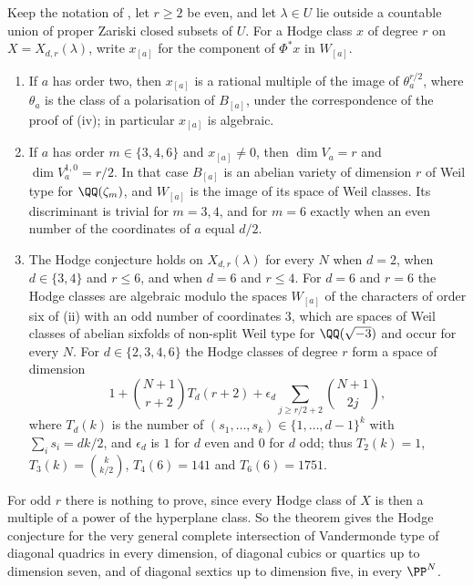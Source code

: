 \begin{theorem}\label{thm:vgvandermonde}
Keep the notation of , let $r\ge2$ be even, and let
$\lambda\in U$ lie outside a countable union of proper Zariski closed
subsets of $U$. For a Hodge class $x$ of degree $r$ on $X=X_{d,r}(\lambda)$,
write $x_{[a]}$ for the component of $\Phi^{*}x$ in $W_{[a]}$.
\begin{enumerate}[label=\textup{(\roman*)},leftmargin=2.6em,itemsep=2pt]
\item If $a$ has order two, then $x_{[a]}$ is a rational multiple of the
  image of $\theta_{a}^{r/2}$, where $\theta_{a}$ is the class of a
  polarisation of $B_{[a]}$, under the correspondence of the proof of
  (iv); in particular $x_{[a]}$ is algebraic.
\item If $a$ has order $m\in\{3,4,6\}$ and $x_{[a]}\ne0$, then $\dim V_{a}=r$
  and $\dim V_{a}^{1,0}=r/2$. In that case $B_{[a]}$ is an abelian variety of
  dimension $r$ of Weil type for $\QQ(\zeta_{m})$, and $W_{[a]}$ is the image
  of its space of Weil classes. Its discriminant is trivial for $m=3,4$, and
  for $m=6$ exactly when an even number of the coordinates of $a$ equal
  $d/2$.
\item The Hodge conjecture holds on $X_{d,r}(\lambda)$ for every $N$ when
  $d=2$, when $d\in\{3,4\}$ and $r\le6$, and when $d=6$ and $r\le4$. For
  $d=6$ and $r=6$ the Hodge classes are algebraic modulo the spaces
  $W_{[a]}$ of the characters of order six of (ii) with an odd number of
  coordinates $3$, which are spaces of Weil classes of abelian sixfolds of
  non-split Weil type for $\QQ(\sqrt{-3})$ and occur for every $N$. For
  $d\in\{2,3,4,6\}$ the Hodge classes of degree $r$ form a space of dimension
  \[
    1+\binom{N+1}{r+2}T_{d}(r+2)+\epsilon_{d}\sum_{j\ge r/2+2}\binom{N+1}{2j},
  \]
  where $T_{d}(k)$ is the number of $(s_{1},\dots,s_{k})\in\{1,\dots,d-1\}^{k}$
  with $\sum_{i}s_{i}=dk/2$, and $\epsilon_{d}$ is $1$ for $d$ even and $0$ for
  $d$ odd; thus $T_{2}(k)=1$, $T_{3}(k)=\binom{k}{k/2}$, $T_{4}(6)=141$ and
  $T_{6}(6)=1751$.
\end{enumerate}
\end{theorem}

For odd $r$ there is nothing to prove, since every Hodge class of $X$ is
then a multiple of a power of the hyperplane class. So the theorem gives the
Hodge conjecture for the very general complete intersection of Vandermonde
type of diagonal quadrics in every dimension, of diagonal cubics or quartics
up to dimension seven, and of diagonal sextics up to dimension five, in
every $\PP^{N}$.

